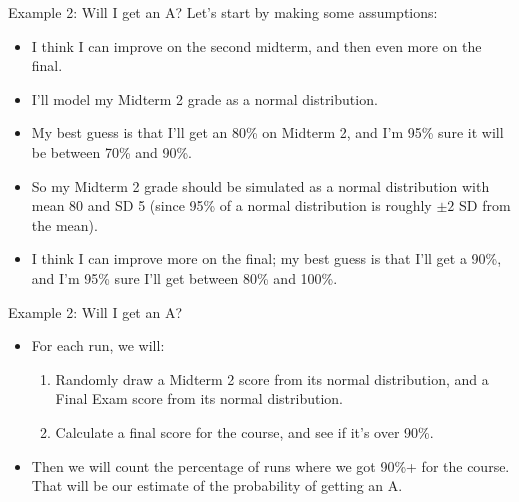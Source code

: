 \documentclass{beamer}\usepackage[]{graphicx}\usepackage[]{color}
\begin{document}
\begin{darkframes}
    \begin{frame}{Example 2: Will I get an A?}
      Let's start by making some assumptions:
      \begin{itemize}[<+->]
        \item I think I can improve on the second midterm, and then even more on the final.
        \item I'll model my Midterm 2 grade as a normal distribution.
        \item My best guess is that I'll get an 80\% on Midterm 2, and I'm 95\% sure it will be between 70\% and 90\%.
        \item So my Midterm 2 grade should be simulated as a normal distribution with mean 80 and SD 5 (since 95\% of a normal distribution is roughly $\pm 2$ SD from the mean).
        \item I think I can improve more on the final; my best guess is that I'll get a 90\%, and I'm 95\% sure I'll get between 80\% and 100\%.
      \end{itemize}
    \end{frame}

    \begin{frame}{Example 2: Will I get an A?}
      \begin{itemize}[<+->]
        \item For each run, we will:
          \begin{enumerate}[<+->]
            \item Randomly draw a Midterm 2 score from its normal distribution, and a Final Exam score from its normal distribution.
            \item Calculate a final score for the course, and see if it's over 90\%.
          \end{enumerate}
        \item Then we will count the percentage of runs where we got 90\%+ for the course. That will be our estimate of the probability of getting an A.
      \end{itemize}
    \end{frame}


\end{darkframes}
\end{document}
